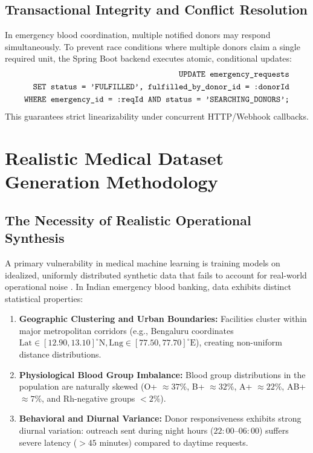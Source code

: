 \documentclass[conference]{IEEEtran}
\begin{document}
\subsection{Transactional Integrity and Conflict Resolution}
In emergency blood coordination, multiple notified donors may respond simultaneously. To prevent race conditions where multiple donors claim a single required unit, the Spring Boot backend executes atomic, conditional updates:
\begin{equation}
\begin{aligned}
\text{\texttt{UPDATE emergency\_requests}} & \\
\text{\texttt{SET status = 'FULFILLED', fulfilled\_by\_donor\_id = :donorId}} & \\
\text{\texttt{WHERE emergency\_id = :reqId AND status = 'SEARCHING\_DONORS';}} &
\end{aligned}
\end{equation}
This guarantees strict linearizability under concurrent HTTP/Webhook callbacks.

\section{Realistic Medical Dataset Generation Methodology}

\subsection{The Necessity of Realistic Operational Synthesis}
A primary vulnerability in medical machine learning is training models on idealized, uniformly distributed synthetic data that fails to account for real-world operational noise \cite{little2019missing, walonoski2018synthea}. In Indian emergency blood banking, data exhibits distinct statistical properties:
\begin{enumerate}
    \item \textbf{Geographic Clustering and Urban Boundaries:} Facilities cluster within major metropolitan corridors (e.g., Bengaluru coordinates $\text{Lat} \in [12.90, 13.10]^\circ\text{N}, \text{Lng} \in [77.50, 77.70]^\circ\text{E}$), creating non-uniform distance distributions.
    \item \textbf{Physiological Blood Group Imbalance:} Blood group distributions in the population are naturally skewed (O+ $\approx 37\%$, B+ $\approx 32\%$, A+ $\approx 22\%$, AB+ $\approx 7\%$, and Rh-negative groups $<2\%$).
    \item \textbf{Behavioral and Diurnal Variance:} Donor responsiveness exhibits strong diurnal variation: outreach sent during night hours ($22:00$--$06:00$) suffers severe latency ($>45$ minutes) compared to daytime requests.
\end{enumerate}
\end{document}
